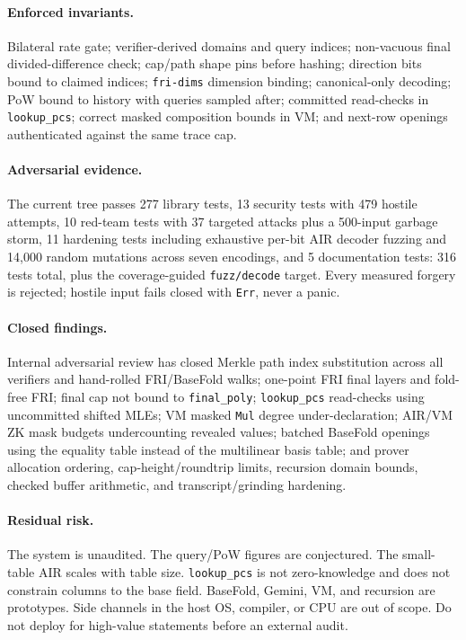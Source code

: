 \documentclass[11pt,a4paper]{article}
\begin{document}
\paragraph{Enforced invariants.} Bilateral rate gate; verifier-derived
domains and query indices; non-vacuous final divided-difference check;
cap/path shape pins before hashing; direction bits bound to claimed indices;
\texttt{fri-dims} dimension binding; canonical-only decoding; PoW bound to
history with queries sampled after; committed read-checks in
\texttt{lookup\_pcs}; correct masked composition bounds in VM; and next-row
openings authenticated against the same trace cap.

\paragraph{Adversarial evidence.} The current tree passes 277 library tests,
13 security tests with 479 hostile attempts, 10 red-team tests with 37
targeted attacks plus a 500-input garbage storm, 11 hardening tests including
exhaustive per-bit AIR decoder fuzzing and 14,000 random mutations across
seven encodings, and 5 documentation tests: 316 tests total, plus the
coverage-guided \texttt{fuzz/decode} target. Every measured forgery is
rejected; hostile input fails closed with \texttt{Err}, never a panic.

\paragraph{Closed findings.} Internal adversarial review has closed Merkle
path index substitution across all verifiers and hand-rolled FRI/BaseFold
walks; one-point FRI final layers and fold-free FRI; final cap not bound to
\texttt{final\_poly}; \texttt{lookup\_pcs} read-checks using uncommitted
shifted MLEs; VM masked \texttt{Mul} degree under-declaration; AIR/VM ZK mask
budgets undercounting revealed values; batched BaseFold openings using the
equality table instead of the multilinear basis table; and prover allocation
ordering, cap-height/roundtrip limits, recursion domain bounds, checked
buffer arithmetic, and transcript/grinding hardening.

\paragraph{Residual risk.} The system is unaudited. The query/PoW figures are
conjectured. The small-table AIR scales with table size. \texttt{lookup\_pcs}
is not zero-knowledge and does not constrain columns to the base field.
BaseFold, Gemini, VM, and recursion are prototypes. Side channels in the host
OS, compiler, or CPU are out of scope. Do not deploy for high-value
statements before an external audit.
\end{document}
